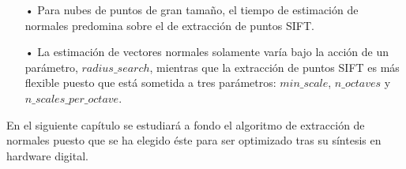 \begin{itemize}
\item[•]Para nubes de puntos de gran tamaño, el tiempo de estimación de normales predomina sobre el de extracción de puntos SIFT.
\item[•]La estimación de vectores normales solamente varía bajo la acción de un parámetro, $radius\_search$, mientras que la extracción de puntos SIFT es más flexible puesto que está sometida a tres parámetros: $min\_scale$, $n\_octaves$ y $n\_scales\_per\_octave$.
\end{itemize}

En el siguiente capítulo se estudiará a fondo el algoritmo de extracción de normales puesto que se ha elegido éste para ser optimizado tras su síntesis en hardware digital.
